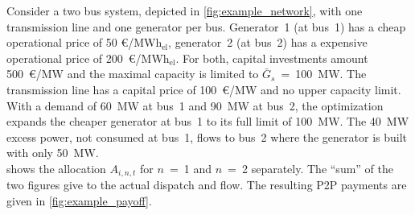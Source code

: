 \documentclass[11pt,twocolumn]{article}
\newcommand{\capacitygenerationupper}{\bar{G}_{s}}
\newcommand{\megawatthour}{MWh$_\text{el}$}
\newcommand{\allocatestate}[1][i, n]{A_{#1,t}}
\begin{document}
Consider a two bus system, depicted in \cref{fig:example_network}, with one transmission line and one generator per bus. Generator~1 (at bus~1) has a cheap operational price of 50 \euro/\megawatthour, generator~2 (at bus~2) has a expensive operational price of 200~\euro/\megawatthour. For both, capital investments amount 500~\euro/MW and the maximal capacity is limited to $\capacitygenerationupper$~=~100~MW. The transmission line has a capital price of 100~\euro/MW and no upper capacity limit. With a demand of 60~MW at bus~1 and 90~MW at bus~2, the optimization expands the cheaper generator at bus~1 to its full limit of 100~MW. The 40~MW excess power, not consumed at bus~1, flows to bus~2 where the generator is built with only 50~MW. \\
% 
 shows the allocation $\allocatestate$ for $n$~=~1 and $n$~=~2 separately. The ``sum'' of the two figures give to the actual dispatch and flow. The resulting P2P payments are given in \cref{fig:example_payoff}.  
\end{document}
